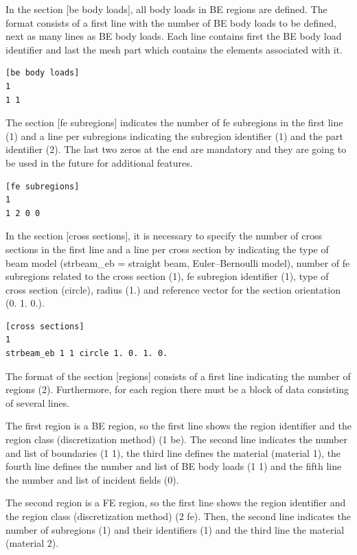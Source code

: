 \documentclass[a4]{article}
\begin{document}
In the section [be body loads], all body loads in BE regions are defined. The format consists of a first line with the number of BE body loads to be defined, next as many lines as BE body loads. Each line contains first the BE body load identifier and last the mesh part which contains the elements associated with it.

\begin{Verbatim}
[be body loads]
1
1 1
\end{Verbatim}

The section [fe subregions] indicates the number of fe subregions in the first line (1) and a line per subregions indicating the subregion identifier (1) and the part identifier (2). The last two zeros at the end are mandatory and they are going to be used in the future for additional features.

\begin{Verbatim}
[fe subregions]
1
1 2 0 0
\end{Verbatim}

In the section [cross sections], it is necessary to specify the number of cross sections in the first line and a line per cross section by indicating the type of beam model (strbeam\_eb = straight beam, Euler–Bernoulli model), number of fe subregions related to the cross section (1), fe subregion identifier (1), type of cross section (circle), radius (1.) and reference vector for the section orientation (0. 1. 0.).

\begin{Verbatim}
[cross sections]
1
strbeam_eb 1 1 circle 1. 0. 1. 0.
\end{Verbatim}

The format of the section [regions] consists of a first line indicating the number of regions (2). Furthermore, for each region there must be a block of data consisting of several lines. 

The first region is a BE region, so the first line shows the region identifier and the region class (discretization method) (1 be). The second line indicates the number and list of boundaries (1 1), the third line defines the material (material 1), the fourth line defines the number and list of BE body loads (1 1) and the fifth line the number and list of incident fields (0).

The second region is a FE region, so the first line shows the region identifier and the region class (discretization method) (2 fe). Then, the second line indicates the number of subregions (1) and their identifiers (1) and the third line the material (material 2). 
\end{document}
